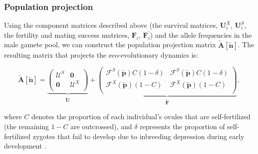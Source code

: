 \documentclass[11pt]{article}
\def\mbf#1{\mathbf{#1}}
\def\mcal#1{\mathcal{#1}}
\begin{document}
\subsubsection*{Population projection}
Using the component matrices described above (the survival matrices, $\mathbf{U}^X_i$, $\mathbf{U}^S_i$, the fertility and mating success matrices, $\mathbf{F}_i$, $\mathbf{F}^\prime_i$) and the allele frequencies in the male gamete pool, we can construct the population projection matrix $\tilde{\mbf{A}}[\tilde{\mbf{n}}]$. The resulting matrix that projects the eco-evolutionary dynamics is:
\begin{linenomath*}
\begin{equation} \label{eq:Atilde}
	\tilde{\mbf{A}}[\tilde{\mbf{n}}] = 
			\underbrace{\left(
			\begin{array}{c|c}
				\mcal{U}^S & \mbf{0} \\ \hline
				\mbf{0} & \mcal{U}^X \\
			\end{array} \right)}_{\tilde{\mbf{U}}} + 
			\underbrace{\left(
			\begin{array}{c|c}
				\mcal{F}^S(\tilde{\mbf{p}}) C(1 - \delta) & \mcal{F}^S(\tilde{\mbf{p}}) C(1 - \delta) \\ \hline
				\mcal{F}^X(\tilde{\mbf{p}}) (1 - C) & \mcal{F}^X(\tilde{\mbf{p}}) (1 - C)\\
			\end{array} \right)}_{\tilde{\mbf{F}}},
\end{equation}
\end{linenomath*}
where $C$ denotes the proportion of each individual's ovules that are self-fertilized (the remaining $1 - C$ are outcrossed), and  $\delta$ represents the proportion of self-fertilized zygotes that fail to develop due to inbreeding depression during early development \citep{Charlesworth1987}. 
\end{document}
